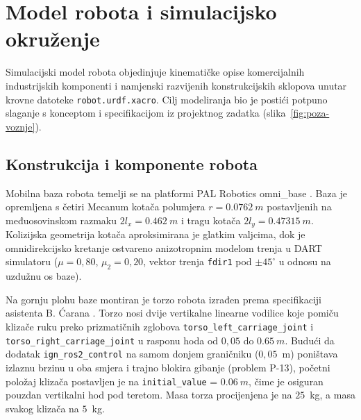 \section{Model robota i simulacijsko okruženje}
\label{sec:03-model-i-okruzenje}

Simulacijski model robota objedinjuje kinematičke opise komercijalnih industrijskih komponenti i
namjenski razvijenih konstrukcijskih sklopova unutar krovne datoteke \texttt{robot.urdf.xacro}.
Cilj modeliranja bio je postići potpuno slaganje s konceptom i specifikacijom iz projektnog
zadatka \cite{mail2026} (slika~\ref{fig:poza-voznje}).

\subsection{Konstrukcija i komponente robota}
\label{sec:03-konstrukcija}

Mobilna baza robota temelji se na platformi PAL Robotics omni\_base \cite{omnibase}. Baza je
opremljena s četiri Mecanum kotača polumjera $r = \SI{0.0762}{m}$ postavljenih na međuosovinskom
razmaku $2l_x = \SI{0.462}{m}$ i tragu kotača $2l_y = \SI{0.47315}{m}$. Kolizijska geometrija
kotača aproksimirana je glatkim valjcima, dok je omnidirekcijsko kretanje ostvareno anizotropnim
modelom trenja u DART simulatoru ($\mu = 0{,}80$, $\mu_2 = 0{,}20$, vektor trenja \texttt{fdir1} pod
$\pm45^\circ$ u odnosu na uzdužnu os baze).


Na gornju plohu baze montiran je torzo robota izrađen prema specifikaciji asistenta B. Ćarana
\cite{mail2026}. Torzo nosi dvije vertikalne linearne vodilice koje
pomiču klizače ruku preko prizmatičnih zglobova \texttt{torso\_left\_carriage\_joint} i
\texttt{torso\_right\_carriage\_joint} u rasponu hoda od $0{,}05$ do $\SI{0.65}{m}$. Budući da
dodatak \texttt{ign\_ros2\_control} na samom donjem graničniku ($0{,}05$~m) poništava izlaznu brzinu
u oba smjera i trajno blokira gibanje (problem P-13), početni položaj klizača postavljen je na
\texttt{initial\_value} = $\SI{0.06}{m}$, čime je osiguran pouzdan vertikalni hod pod teretom.
Masa torza procijenjena je na $25$~kg, a masa svakog klizača na $5$~kg.

